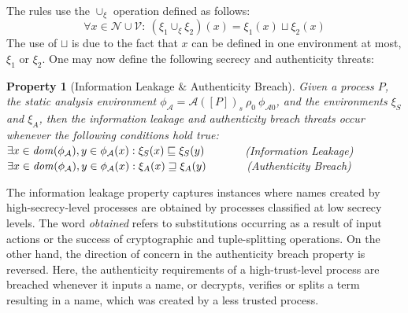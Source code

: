 \documentclass{entcs} \usepackage{entcsmacro}
\begin{document}
The rules use the $\cup_\xi$ operation defined as follows:
\begin{equation}
\forall x\in\mathcal{N}\cup\mathcal{V}:~(\xi_1\cup_\xi\xi_2)(x)=\xi_1(x)\sqcup\xi_2(x)
\end{equation}
The use of $\sqcup$ is due to the fact that $x$ can be defined in one environment at most, $\xi_1$ or $\xi_2$.  One may now define the following secrecy and authenticity threats:
\newtheorem{prope}{Property}
\begin{prope}[Information Leakage $\&$ Authenticity Breach]
Given a process $P$, the static analysis environment $\phi_\mathcal{A}=\mathcal{A}(\![P]\!)_s~\rho_0~\phi_{\mathcal{A}0}$, and the environments $\xi_S$ and $\xi_A$, then the {\itshape information leakage\/} and {\itshape authenticity breach\/} threats occur whenever the following conditions hold true:\\

\noindent
$\exists x\in\mbox{{\itshape dom\/}}(\phi_\mathcal{A}),y\in\phi_\mathcal{A}(x):\xi_S(x)\sqsubseteq\xi_S(y)$~~~~~~~(Information Leakage)\\
$\exists x\in\mbox{{\itshape dom\/}}(\phi_\mathcal{A}),y\in\phi_\mathcal{A}(x):\xi_A(x)\sqsupseteq\xi_A(y)$~~~~~~~(Authenticity Breach)\end{prope}
The information leakage property captures instances where names created by high-secrecy-level processes are obtained by processes classified at low secrecy levels.  The word {\itshape obtained\/} refers to substitutions occurring as a result of input actions or the success of cryptographic and tuple-splitting operations.  On the other hand, the direction of concern in the authenticity breach property is reversed. Here, the authenticity requirements of a high-trust-level process are breached whenever it inputs a name, or decrypts, verifies or splits a term resulting in a name, which was created by a less trusted process.
\end{document}
